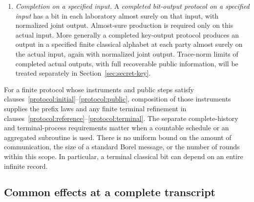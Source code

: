 \begin{definition}
\begin{enumerate}
Together with the preceding schedule, these refinements give one
countably additive, unnormalized instrument law on the complete history
and the terminal outcomes, for all initial inputs and finite untouched
references.  Include a tag for a missing or noninvoked readout among
each laboratory's outcomes.  Summing either laboratory's terminal
outcomes removes that local refinement.  Summing both and tracing the
output memories recovers the reference measure on the complete history
with its stated finite-prefix marginals.

After any terminal outcomes have been included, each prescribed output
status is a measurable local value in the finite output alphabet
together with a symbol $\perp$ for nonproduction.  An output already
produced is retained.  The incoming-memory and compatibility requirements
concern only memory used by a terminal readout; unused memory need not
converge.  An unspecified evolution through infinitely many quantum
operations does not by itself define a terminal readout.

\item\label{protocol:completion} \textit{Completion on a specified input.}
A \emph{completed bit-output protocol on a specified input} has a bit
in each laboratory almost surely on that input, with normalized joint
output.  Almost-sure production is required only on this actual input.
More generally a completed key-output protocol produces an output in a
specified finite classical alphabet at each party almost surely on the
actual input, again with normalized joint output.  Trace-norm limits of
completed actual outputs, with full recoverable public information, will be
treated separately in Section~\ref{sec:secret-key}.
\end{enumerate}
\end{definition}

For a finite protocol whose instruments and public steps satisfy
clauses~\ref{protocol:initial}--\ref{protocol:public},
composition of those instruments supplies the prefix laws
and any finite terminal refinement in
clauses~\ref{protocol:reference}--\ref{protocol:terminal}.  The separate
complete-history and terminal-process requirements matter when a countable
schedule or an aggregated subroutine is used.
There is no uniform bound on the amount of communication, the size of a
standard Borel message, or the number of rounds within this scope.  In
particular, a terminal classical bit can depend on an entire infinite
record.

\subsection{Common effects at a complete transcript}

